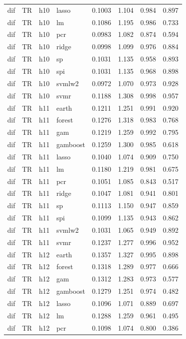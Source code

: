 \begin{ThreePartTable}
\begin{longtable}[t]{llclcccc}
dif & TR & h10 & lasso & 0.1003 & 1.104 & 0.984 & 0.897\\
dif & TR & h10 & lm & 0.1086 & 1.195 & 0.986 & 0.733\\
dif & TR & h10 & pcr & 0.0983 & 1.082 & 0.874 & 0.594\\
dif & TR & h10 & ridge & 0.0998 & 1.099 & 0.976 & 0.884\\
dif & TR & h10 & sp & 0.1031 & 1.135 & 0.958 & 0.893\\
dif & TR & h10 & spi & 0.1031 & 1.135 & 0.968 & 0.898\\
dif & TR & h10 & svmlw2 & 0.0972 & 1.070 & 0.973 & 0.928\\
dif & TR & h10 & svmr & 0.1188 & 1.308 & 0.998 & 0.957\\
\addlinespace
dif & TR & h11 & earth & 0.1211 & 1.251 & 0.991 & 0.920\\
dif & TR & h11 & forest & 0.1276 & 1.318 & 0.983 & 0.768\\
dif & TR & h11 & gam & 0.1219 & 1.259 & 0.992 & 0.795\\
dif & TR & h11 & gamboost & 0.1259 & 1.300 & 0.985 & 0.618\\
dif & TR & h11 & lasso & 0.1040 & 1.074 & 0.909 & 0.750\\
dif & TR & h11 & lm & 0.1180 & 1.219 & 0.981 & 0.675\\
dif & TR & h11 & pcr & 0.1051 & 1.085 & 0.843 & 0.517\\
dif & TR & h11 & ridge & 0.1047 & 1.081 & 0.941 & 0.801\\
dif & TR & h11 & sp & 0.1113 & 1.150 & 0.947 & 0.859\\
dif & TR & h11 & spi & 0.1099 & 1.135 & 0.943 & 0.862\\
dif & TR & h11 & svmlw2 & 0.1031 & 1.065 & 0.949 & 0.892\\
dif & TR & h11 & svmr & 0.1237 & 1.277 & 0.996 & 0.952\\
\addlinespace
dif & TR & h12 & earth & 0.1357 & 1.327 & 0.995 & 0.898\\
dif & TR & h12 & forest & 0.1318 & 1.289 & 0.977 & 0.666\\
dif & TR & h12 & gam & 0.1312 & 1.283 & 0.973 & 0.577\\
dif & TR & h12 & gamboost & 0.1279 & 1.251 & 0.974 & 0.482\\
dif & TR & h12 & lasso & 0.1096 & 1.071 & 0.889 & 0.697\\
dif & TR & h12 & lm & 0.1288 & 1.259 & 0.961 & 0.495\\
dif & TR & h12 & pcr & 0.1098 & 1.074 & 0.800 & 0.386\\

\end{longtable}
\end{ThreePartTable}
